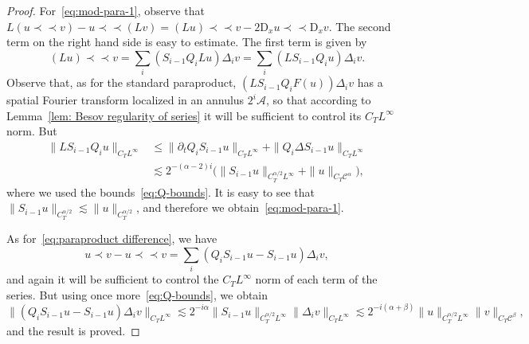 \documentclass[11pt,a4paper]{article}
\newcommand{\mathD}{\mathrm{D}}
\newcommand{\precprec}{\prec\!\!\!\prec}
\theoremstyle{remark}
\newcommand{\CA}{\ensuremath{\mathscr{A}}}
\newcommand{\CC}{\ensuremath{\mathscr{C}}}
\begin{document}
\begin{proof}
  For~\eqref{eq:mod-para-1}, observe that $L(u \precprec v ) - u\precprec (Lv) = (Lu) \precprec v - 2 \mathD_x u \precprec \mathD_x v$. The second term on the right hand side is easy to estimate. The first term is given by
  \[
     ( L u ) \precprec v = \sum_{i} ( S_{i-1} Q_{i} L u  )  \Delta_{i} v = \sum_{i} ( L S_{i-1} Q_{i} u ) \Delta_{i} v.
  \]
  Observe that, as for the standard paraproduct, $( L S_{i-1} Q_{i}  F ( u )) \Delta_{i} v$ has a spatial Fourier transform localized in an
  annulus $2^{i} \CA$, so that according to Lemma~\ref{lem: Besov regularity of series} it will be sufficient to control its $C_T L^\infty$ norm. But
  \begin{align*}
     \| L S_{i-1} Q_{i} u \|_{C_TL^{\infty}} & \leqslant \| \partial_{t} Q_{i} S_{i-1}  u  \|_{C_TL^{\infty}} + \| Q_{i} \Delta  S_{i-1}  u  \|_{C_TL^{\infty}} \\
     & \lesssim 2^{- ( \alpha -2 ) i} \big( \| S_{i-1}  u  \|_{C_{T}^{\alpha /2} L^{\infty}} + \| u \|_{C_{T} \CC^\alpha}\big),
  \end{align*}
  where we used the bounds~{\eqref{eq:Q-bounds}}. It is easy to see that $ \| S_{i-1}  u  \|_{C_{T}^{\alpha /2}} \lesssim \| u \|_{C_T^{\alpha/2}}$, and therefore we obtain~\eqref{eq:mod-para-1}.
  
  As for~\eqref{eq:paraproduct difference}, we have
  \[
     u \prec v - u \precprec v = \sum_{i} ( Q_{i} S_{i-1}  u -S_{i-1}  u ) \Delta_{i} v,
  \]
  and again it will be sufficient to control the $C_T L^\infty$ norm of each term of the series. But using once more~{\eqref{eq:Q-bounds}}, we obtain
  \[
     \| (Q_{i} S_{i-1}  u -S_{i-1}  u ) \Delta_{i} v \|_{C_T L^{\infty}} \lesssim 2^{-i \alpha} \| S_{i-1} u \|_{C_{T}^{\alpha /2} L^{\infty}} \| \Delta_{i} v \|_{C_T L^{\infty}} \lesssim 2^{-i(\alpha+\beta)} \| u \|_{C_{T}^{\alpha /2} L^{\infty}} \| v \|_{C_T\CC^{\beta}},
  \]
  and the result is proved.
\end{proof}
\end{document}
